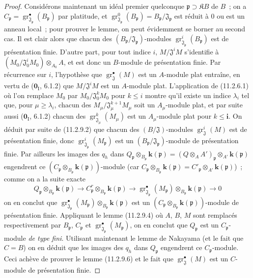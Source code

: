 \begin{proof}
Considérons maintenant un idéal premier quelconque
$\mathfrak p\supset\mathfrak KB$ de $B$~; on a
$C_\mathfrak p=\operatorname{gr}_{\mathfrak J_\mathfrak p}^\bullet(B_\mathfrak p)$
par platitude, et
$\operatorname{gr}_{\mathfrak J_\mathfrak p}^0(B_\mathfrak p)
=B_\mathfrak p/\mathfrak J_\mathfrak p$ est réduit à 0 ou est un anneau
local~; pour prouver le lemme, on peut évidemment se borner au second cas. Il
est clair alors que chacun des $(B_\mathfrak p/\mathfrak J_\mathfrak p)$-modules
$\operatorname{gr}_{\mathfrak J_\mathfrak p}^i(B_\mathfrak p)$ est de
présentation finie. D'autre part, pour tout indice $i$,
$M/\mathfrak J^iM$ s'identifie à
$(M_0/\mathfrak J_0^iM_0)\otimes_{A_0}A$, et est donc un $B$-module de
présentation finie. Par récurrence sur $i$, l'hypothèse que
$\operatorname{gr}_{\mathfrak J}^\bullet(M)$ est un $A$-module plat entraîne, en
vertu de ($\mathbf 0_{\mathrm I}$, 6.1.2) que $M/\mathfrak J^iM$ est un
$A$-module plat. L'application de (11.2.6.1) où l'on remplace $M_0$ par
$M_0/\mathfrak J_0^kM_0$ pour $k\leq i$ montre qu'il existe un indice
$\lambda_i$ tel que, pour $\mu\geq\lambda_i$, chacun des
$M_\mu/\mathfrak J_\mu^{k+1}M_\mu$ soit un $A_\mu$-module plat, et par suite
aussi ($\mathbf 0_{\mathrm I}$, 6.1.2) chacun des
$\operatorname{gr}_{\mathfrak J_\mu}^k(M_\mu)$ est un $A_\mu$-module plat
pour $k\leq\boldsymbol{i}$. On déduit par suite de (11.2.9.2) que chacun des
$(B/\mathfrak J)$-modules $\operatorname{gr}_{\mathfrak J}^i(M)$ est de
présentation finie, donc
$\operatorname{gr}_{\mathfrak J_\mathfrak p}^i(M_\mathfrak p)$ est un
$(B_\mathfrak p/\mathfrak J_\mathfrak p)$-module de présentation finie. Par
ailleurs les images des $q_h$ dans
$Q_\mathfrak p\otimes_{B_\mathfrak p}\boldsymbol{k}(\mathfrak p)
=(Q\otimes_AA')_\mathfrak p\otimes_{A'}\boldsymbol{k}(\mathfrak p)$
engendrent ce
$(C_\mathfrak p\otimes_{B_\mathfrak p}\boldsymbol{k}(\mathfrak p))$-module
(car $C_\mathfrak p\otimes_{B_\mathfrak p}\boldsymbol{k}(\mathfrak p)
=C'_\mathfrak p\otimes_{A'}\boldsymbol{k}(\mathfrak p)$)~;
comme on a la suite exacte
\[
Q_\mathfrak p\otimes_{B_\mathfrak p}\boldsymbol{k}(\mathfrak p)
\longrightarrow C_\mathfrak p^{r}\otimes_{B_\mathfrak p}\boldsymbol{k}(\mathfrak p)
\longrightarrow
\operatorname{gr}_{\mathfrak J_\mathfrak p}^\bullet(M_\mathfrak p)
\otimes_{B_\mathfrak p}\boldsymbol{k}(\mathfrak p)\longrightarrow0
\]
on en conclut que
$\operatorname{gr}_{\mathfrak J_\mathfrak p}^\bullet(M_\mathfrak p)
\otimes_{B_\mathfrak p}\boldsymbol{k}(\mathfrak p)$ est un
$(C_\mathfrak p\otimes_{B_\mathfrak p}\boldsymbol{k}(\mathfrak p))$-module de présentation
finie. Appliquant le lemme (11.2.9.4) où $A$, $B$, $M$ sont remplacés
respectivement par $B_\mathfrak p$, $C_\mathfrak p$ et
$\operatorname{gr}_{\mathfrak J_\mathfrak p}^\bullet(M_\mathfrak p)$, on en conclut
que $Q_\mathfrak p$ est un $C_\mathfrak p$-module \emph{de type fini}. Utilisant
maintenant le lemme de Nakayama (et le fait que $C=B$) on en déduit que les
images des $q_h$ dans $Q_\mathfrak p$ engendrent ce $C_\mathfrak p$-module.
Ceci achève de prouver le lemme (11.2.9.6) et le fait que
$\operatorname{gr}_{\mathfrak J}^\bullet(M)$ est un $C$-module de présentation
finie.


\end{proof}
